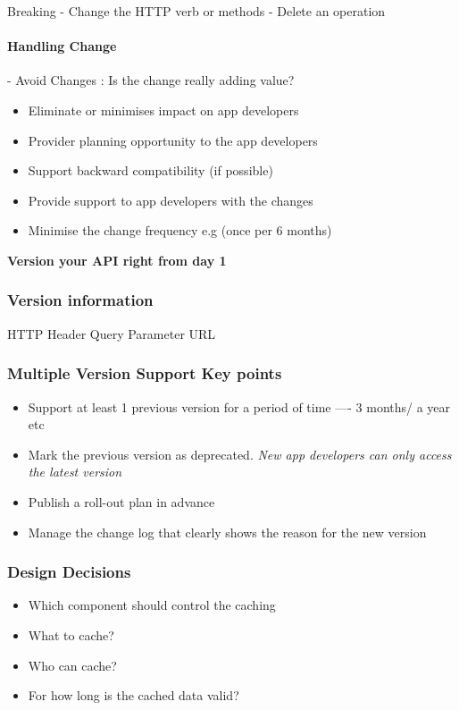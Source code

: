 Breaking
- Change the HTTP verb or methods
- Delete an operation

\paragraph{Handling Change}
- Avoid Changes : Is the change really adding value?
\begin{itemize}
    \item Eliminate or minimises impact on app developers
    \item Provider planning opportunity to the app developers
    \item Support backward compatibility (if possible)
    \item Provide support to app developers with the changes
    \item Minimise the change frequency e.g (once per 6 months)
\end{itemize}
\textbf{Version your API right from day 1}

\subsubsection{Version information}
HTTP Header
Query Parameter
URL

\subsubsection{Multiple Version Support Key points}
\begin{itemize}
    \item Support at least 1 previous version for a period of time ---- 3 months/ a year etc
    \item Mark the previous version as deprecated. \textit{New app developers can only access the latest version}
    \item Publish a roll-out plan in advance
    \item Manage the change log that clearly shows the reason for the new version
\end{itemize}

\subsubsection{Design Decisions}
\begin{itemize}
    \item Which component should control the caching
    \item What to cache?
    \item Who can cache?
    \item For how long is the cached data valid?
\end{itemize}


